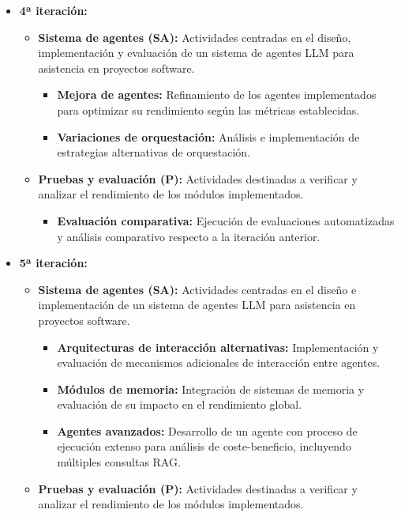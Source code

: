 \begin{itemize}
\begin{itemize}
\begin{itemize}
        \end{itemize}
    \end{itemize}
  \item\textbf{4ª iteración:}
    \begin{itemize}
      \item\textbf{Sistema de agentes (SA):} Actividades centradas en el diseño, implementación y evaluación de un sistema de agentes LLM para asistencia en proyectos software.
        \begin{itemize}
          \item\textbf{Mejora de agentes:} Refinamiento de los agentes implementados para optimizar su rendimiento según las métricas establecidas.
          \item\textbf{Variaciones de orquestación:} Análisis e implementación de estrategias alternativas de orquestación. 
        \end{itemize}
      \item\textbf{Pruebas y evaluación (P):} Actividades destinadas a verificar y analizar el rendimiento de los módulos implementados.
        \begin{itemize}
          \item\textbf{Evaluación comparativa:} Ejecución de evaluaciones automatizadas y análisis comparativo respecto a la iteración anterior.
        \end{itemize}
    \end{itemize}
  \item\textbf{5ª iteración:}
    \begin{itemize}
      \item\textbf{Sistema de agentes (SA):} Actividades centradas en el diseño e implementación de un sistema de agentes LLM para asistencia en proyectos software.
        \begin{itemize}
          \item\textbf{Arquitecturas de interacción alternativas:} Implementación y evaluación de mecanismos adicionales de interacción entre agentes.
          \item\textbf{Módulos de memoria:} Integración de sistemas de memoria y evaluación de su impacto en el rendimiento global. 
          \item\textbf{Agentes avanzados:} Desarrollo de un agente con proceso de ejecución extenso para análisis de coste-beneficio, incluyendo múltiples consultas RAG. 
        \end{itemize}
      \item\textbf{Pruebas y evaluación (P):} Actividades destinadas a verificar y analizar el rendimiento de los módulos implementados.

\end{itemize}
\end{itemize}
